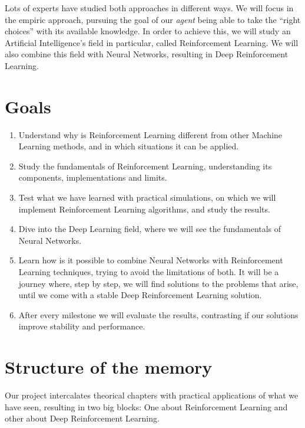 Lots of experts have studied both approaches in different ways. We will focus in the empiric approach, pursuing the goal of our \textit{agent} being able to take the ``right choices'' with its available knowledge. In order to achieve this, we will study an Artificial Intelligence's field in particular, called Reinforcement Learning. We will also combine this field with Neural Networks, resulting in Deep Reinforcement Learning.


\section{Goals}

\begin{enumerate}
    \item Understand why is Reinforcement Learning different from other Machine Learning methods, and in which situations it can be applied.
    \item Study the fundamentals of Reinforcement Learning, understanding its components, implementations and limits.
    \item Test what we have learned with practical simulations, on which we will implement Reinforcement Learning algorithms, and study the results.
    \item Dive into the Deep Learning field, where we will see the fundamentals of Neural Networks.
    \item Learn how is it possible to combine Neural Networks with Reinforcement Learning techniques, trying to avoid the limitations of both. It will be a journey where, step by step, we will find solutions to the problems that arise, until we come with a stable Deep Reinforcement Learning solution.
    \item After every milestone we will evaluate the results, contrasting if our solutions improve stability and performance.
\end{enumerate}


\section{Structure of the memory}

Our project intercalates theorical chapters with practical applications of what we have seen, resulting in two big blocks: One about Reinforcement Learning and other about Deep Reinforcement Learning.

